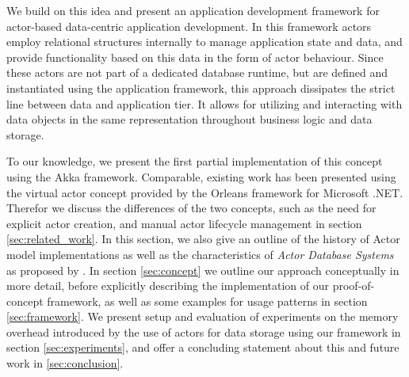   We build on this idea and present an application development framework for actor-based data-centric application development.
  In this framework actors employ relational structures internally to manage application state and data,
  and provide functionality based on this data in the form of actor behaviour.
  Since these actors are not part of a dedicated database runtime, but are defined and instantiated using the application framework, this approach dissipates the strict line between data and application tier.
  It allows for utilizing and interacting with data objects in the same representation throughout business logic and data storage.

  To our knowledge, we present the first partial implementation of this concept using the Akka framework.
  Comparable, existing work has been presented using the virtual actor concept provided by the Orleans framework for Microsoft .NET.
  Therefor we discuss the differences of the two concepts, such as the need for explicit actor creation, and manual actor lifecycle management in section \ref{sec:related_work}.
  In this section, we also give an outline of the history of Actor model implementations as well as the characteristics of \textit{Actor Database Systems} as proposed by \citeauthor{manifesto}.
  In section \ref{sec:concept} we outline our approach conceptually in more detail,
  before explicitly describing the implementation of our proof-of-concept framework, as well as some examples for usage patterns in section \ref{sec:framework}.
  We present setup and evaluation of experiments on the memory overhead introduced by the use of actors for data storage using our framework in section \ref{sec:experiments},
  and offer a concluding statement about this and future work in \ref{sec:conclusion}.
  
